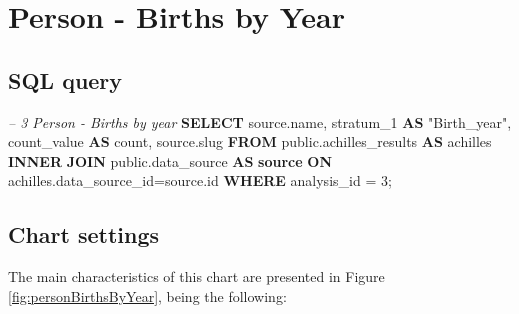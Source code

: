 \documentclass[]{book}
\newenvironment{Shaded}{\begin{snugshade}}{\end{snugshade}}
\newcommand{\KeywordTok}[1]{\textcolor[rgb]{0.13,0.29,0.53}{\textbf{#1}}}
\newcommand{\DecValTok}[1]{\textcolor[rgb]{0.00,0.00,0.81}{#1}}
\newcommand{\CommentTok}[1]{\textcolor[rgb]{0.56,0.35,0.01}{\textit{#1}}}
\newcommand{\OtherTok}[1]{\textcolor[rgb]{0.56,0.35,0.01}{#1}}
\newcommand{\FunctionTok}[1]{\textcolor[rgb]{0.00,0.00,0.00}{#1}}
\newcommand{\NormalTok}[1]{#1}
\begin{document}
\section{Person - Births by Year}\label{person---births-by-year}

\subsection{SQL query}\label{sql-query-8}

\begin{Shaded}
\begin{Highlighting}[]
\CommentTok{-- 3  Person - Births by year}
\KeywordTok{SELECT}\NormalTok{ source.name,}
\NormalTok{       stratum_1 }\KeywordTok{AS} \OtherTok{"Birth_year"}\NormalTok{,}
\NormalTok{       count_value }\KeywordTok{AS} \FunctionTok{count}\NormalTok{, }
\NormalTok{       source.slug}
\KeywordTok{FROM}\NormalTok{ public.achilles_results }\KeywordTok{AS}\NormalTok{ achilles }\KeywordTok{INNER} \KeywordTok{JOIN} 
\NormalTok{      public.data_source }\KeywordTok{AS} \KeywordTok{source} \KeywordTok{ON} 
\NormalTok{    achilles.data_source_id=source.id}
\KeywordTok{WHERE}\NormalTok{ analysis_id = }\DecValTok{3}\NormalTok{;}
\end{Highlighting}
\end{Shaded}

\subsection{Chart settings}\label{chart-settings-8}

The main characteristics of this chart are presented in Figure
\ref{fig:personBirthsByYear}, being the following:
\end{document}
